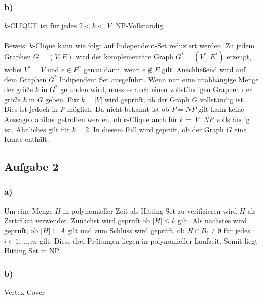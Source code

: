 \documentclass[12pt,a4paper]{article}
\begin{document}
\subsubsection*{b)}
$k$-CLIQUE ist für jedes $2 < k < |V|$ NP-Vollständig. 
\\\\
Beweis: $k$-Clique kann wie folgt auf Independent-Set reduziert werden.
Zu jedem Graphen $G=(V,E)$ wird der komplementäre Graph $G^*=(V^*,E^*)$ erzeugt, wobei $V^*=V$ und $e \in E^*$ genau dann, wenn $e \notin E$ gilt. Anschließend wird auf dem Graphen $G^*$ Indipendent Set ausgeführt. Wenn nun eine unabhängige Menge der größe $k$ in $G^*$ gefunden wird, muss es auch einen vollständigen Graphen der größe $k$ in $G$ geben.
Für $k=|V|$ wird geprüft, ob der Graph $G$ vollständig ist. Dies ist jedoch in $P$ möglich. Da nicht bekannt ist ob $P=NP$ gilt kann keine Aussage darüber getroffen werden, ob $k$-Clique auch für $k=|V|$ $NP$ vollständig ist. Ähnliches gilt für $k=2$. In diesem Fall wird geprüft, ob der Graph $G$ eine Kante enthält.

\subsection*{Aufgabe 2}
\subsubsection*{a)}
Um eine Menge $H$ in polynomieller Zeit als Hitting Set zu verifizieren wird $H$ als Zertifikat verwendet.
Zunächst wird geprüft ob $|H|\le k$ gilt. Als nächstes wird geprüft, ob $|H|\subseteq A$ gilt und zum Schluss wird geprüft, ob $H \cap B_i \neq \emptyset$ für jedes $i \in {1,...,m}$ gilt.
Diese drei Prüfungen liegen in polynomieller Laufzeit. Somit liegt Hitting Set in NP.

\subsubsection*{b)}
Vertex Cover
\end{document}
